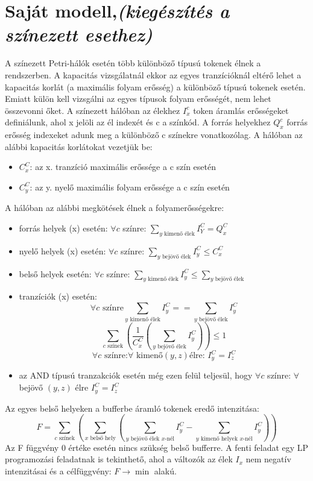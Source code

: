 \section{Saját modell,\textsl{(kiegészítés a színezett esethez)}}
A színezett Petri-hálók esetén több különböző típusú tokenek élnek a rendszerben. A kapacitás vizsgálatnál ekkor az egyes tranzícióknál eltérő lehet a kapacitás korlát (a maximális folyam erősség) a különböző típusú tokenek esetén. Emiatt külön kell vizsgálni az egyes típusok folyam erősségét, nem lehet összevonni őket. 
A színezett hálóban az élekhez $I^c_x$ token áramlás erősségeket definiálunk, ahol x jelöli az él indexét és c a színkód. A forrás helyekhez $Q^c_x$ forrás erősség indexeket adunk meg a különböző c színekre vonatkozólag. A hálóban az alábbi kapacitás korlátokat vezetjük be:
\begin{itemize}
\item $C^C_x$: az x. tranzíció maximális erőssége a c szín esetén 
\item $C^C_y$: az y. nyelő maximális folyam erőssége a c szín esetén
\end{itemize}
A hálóban az alábbi megkötések élnek a folyamerősségekre:
\begin{itemize}
\item forrás helyek (x) esetén: $\forall c$ színre: $\sum_{y\text{ kimenő élek}}I^C_Y = Q^C_x$
\item nyelő helyek (x) esetén: $\forall c$ színre: $\sum_{y\text{ bejövő élek}}I^C_y \leq C^C_x$
\item belső helyek esetén: $\forall c$ színre: $\sum_{y\text{ kimenő élek}} I^C_y \leq \sum_{y\text{ bejövő élek}}$
\item tranzíciók (x) esetén:
$$\forall c \text{ színre} \sum_{y\text{ kimenő élek}} I^C_y == \sum_{y\text{ bejövő élek}} I^C_y $$
$$\sum_{c \text{ színek}}\left( \frac{1}{C^C_x} \left( \sum_{y \text{ bejövő élek}} I^C_y \right) \right) \leq 1$$
$$\forall c \text{ színre:} \forall \text{ kimenő} (y,z) \text{élre: } I^C_y=I^C_z$$
\item az AND típusú tranzakciók esetén még ezen felül teljesül, hogy 	$\forall c$ színre: $\forall$ bejövő $(y,z)$ élre $I^C_y=I^C_z$
\end{itemize}
Az egyes belső helyeken a bufferbe áramló tokenek  eredő intenzitása:
$$F=\sum_{c\text{ színek}} \left( \sum_{x\text{ belső hely}}\left( \sum_{y\text{ bejövő élek }x\text{-nél}}I^C_y - \sum_{y \text{ kimenő helyek }x\text{-nél}} I^C_y \right) \right)$$
Az F függvény 0 értéke esetén nincs szükség belső bufferre. 
A fenti feladat egy LP programozási feladatnak is tekinthető, ahol a változók az élek $I_x$ nem negatív intenzitásai és a célfüggvény: $F \rightarrow \min$ alakú. 

